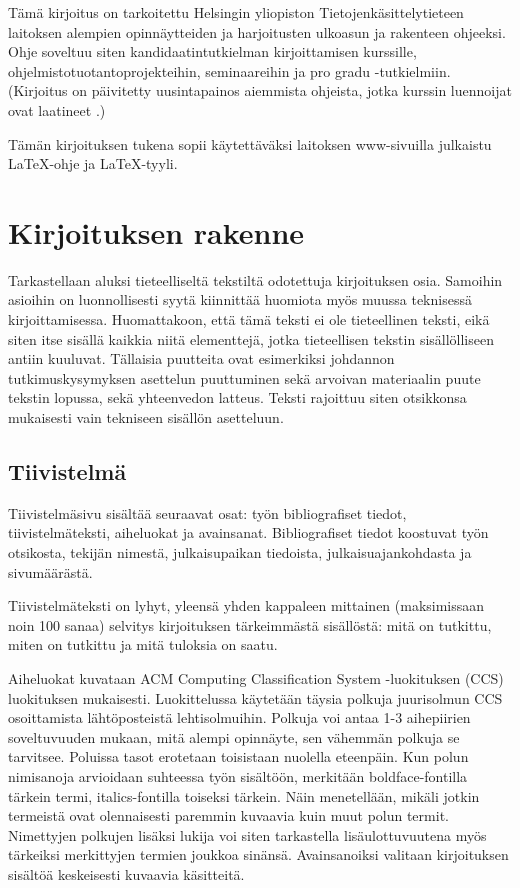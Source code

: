 \documentclass[finnish,gradu]{tktltiki}
\begin{document}
Tämä kirjoitus on tarkoitettu Helsingin yliopiston
Tietojenkäsittelytieteen laitoksen alempien opinnäytteiden ja
harjoitusten ulkoasun ja rakenteen ohjeeksi. Ohje soveltuu siten
kandidaatintutkielman kirjoittamisen kurssille, ohjelmistotuotantoprojekteihin, seminaareihin ja
pro gradu -tutkielmiin. (Kirjoitus on päivitetty uusintapainos aiemmista
ohjeista, jotka kurssin luennoijat ovat laatineet \cite{erkio01,
erkiomakela96, erkio94, verkamo92}.)

Tämän kirjoituksen tukena sopii käytettäväksi  laitoksen
www-sivuilla julkaistu \LaTeX-ohje ja \LaTeX-tyyli.


\section{Kirjoituksen rakenne}

Tarkastellaan aluksi tieteelliseltä tekstiltä odotettuja
kirjoituksen osia. Samoihin asioihin on luonnollisesti syytä
kiinnittää huomiota myös muussa teknisessä kirjoittamisessa. Huomattakoon, että tämä teksti ei ole tieteellinen teksti, eikä siten itse sisällä kaikkia niitä elementtejä, jotka tieteellisen tekstin sisällölliseen antiin kuuluvat. Tällaisia puutteita ovat esimerkiksi johdannon tutkimuskysymyksen asettelun puuttuminen sekä arvoivan materiaalin puute tekstin lopussa, sekä yhteenvedon latteus.
Teksti rajoittuu siten otsikkonsa mukaisesti vain tekniseen sisällön asetteluun.

\subsection{Tiivistelmä}



Tiivistelmäsivu sisältää seuraavat osat: työn bibliografiset tiedot,
tiivistelmäteksti, aiheluokat ja avainsanat. Bibliografiset tiedot
koostuvat työn otsikosta, tekijän nimestä, julkaisupaikan tiedoista,
julkaisuajankohdasta ja sivumäärästä.

Tiivistelmäteksti on lyhyt, yleensä yhden kappaleen mittainen
(maksimissaan noin 100 sanaa) selvitys
kirjoituksen tärkeimmästä sisällöstä: mitä on tutkittu, miten on
tutkittu ja mitä tuloksia on saatu.


Aiheluokat kuvataan ACM Computing Classification System -luokituksen (CCS)
luokituksen mukaisesti. Luokittelussa käytetään täysia polkuja juurisolmun CCS osoittamista lähtöposteistä lehtisolmuihin. Polkuja voi antaa 1-3 aihepiirien soveltuvuuden mukaan, mitä alempi opinnäyte, sen vähemmän polkuja se tarvitsee. 
Poluissa tasot erotetaan toisistaan nuolella eteenpäin. Kun  polun nimisanoja arvioidaan suhteessa työn sisältöön, merkitään boldface-fontilla tärkein termi, italics-fontilla toiseksi tärkein. Näin menetellään, mikäli jotkin termeistä ovat olennaisesti paremmin kuvaavia kuin muut polun termit. Nimettyjen polkujen lisäksi lukija voi siten tarkastella lisäulottuvuutena myös tärkeiksi merkittyjen termien joukkoa sinänsä.
Avainsanoiksi valitaan kirjoituksen sisältöä
keskeisesti kuvaavia käsitteitä.
\end{document}
